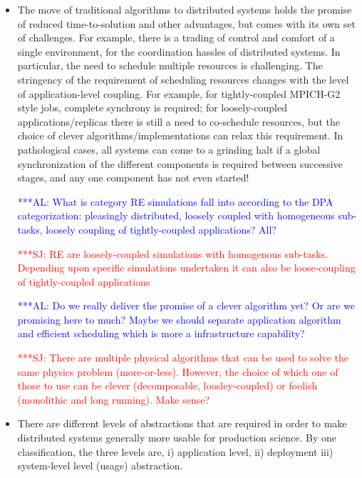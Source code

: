 \documentclass{rspublic}
\newcommand{\alnote}[1]{ {\textcolor{blue} { ***AL: #1 }}}
\newcommand{\jhanote}[1]{ {\textcolor{red} { ***SJ: #1 }}}
\newcommand{\alnote}[1]{}
\newcommand{\jhanote}[1]{}
\begin{document}
\begin{itemize}
  \item The move of traditional algorithms to distributed systems holds
    the promise of reduced time-to-solution and other advantages, but
    comes with its own set of challenges. For example, there is a
    trading of control and comfort of a single environment, for the
    coordination hassles of distributed systems. In particular, the need
    to schedule multiple resources is challenging. The stringency of the
    requirement of scheduling resources changes with the level of
    application-level coupling. For example, for tightly-coupled
    MPICH-G2 style jobs, complete synchrony is required; for
    loosely-coupled applications/replicas there is still a need to
    co-schedule resources, but the choice of clever
    algorithms/implementations can relax this requirement. In
    pathological cases, all systems can come to a grinding halt if a
    global synchronization of the different components is required
    between successive stages, and any one component has not even
    started!  

    \alnote{What is category RE simulations fall into according to the
      DPA categorization: pleasingly distributed, loosely coupled with
      homogeneous sub-tasks, loosely coupling of tightly-coupled
      applications? All?}
  
    \jhanote{RE are loosely-coupled simulations with homogenous
      sub-tasks. Depending upon specific simulations undertaken it can
      also be loose-coupling of tightly-coupled applications}

    \alnote{Do we really deliver the promise of a clever algorithm
      yet? Or are we promising here to much? Maybe we should separate
      application algorithm and efficient scheduling which is more a
      infrastructure capability?}

    \jhanote{There are multiple physical algorithms that can be
      used to solve the same physics problem (more-or-less).
      However, the choice of which one of those to use can be
      clever (decomposable, loosley-coupled) or foolish (monolithic
      and long running). Make sense?}

  \item There are different levels of abstractions that are required
    in order to make distributed systems generally more usable for
    production science. By one classification, the three levels are,
    i) application level, ii) deployment iii) system-level level
    (usage) abstraction.



\end{itemize}
\end{document}

